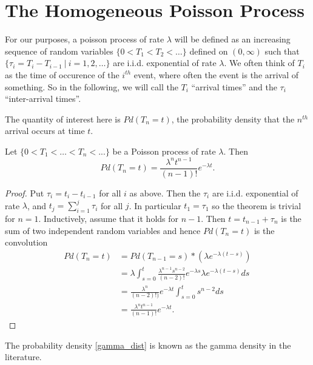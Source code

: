 \documentclass[12pt,leqno]{article}
\begin{document}
\section{The Homogeneous Poisson Process}
For our purposes, a poisson process of rate $\lambda$ will be defined as an increasing sequence of random variables
$ \{0 < T_1 < T_2 < \dots\}$ defined on $(0,\infty)$ such that $\{\tau_i = T_i-T_{i-1}~|~ i = 1,2,\dots\}$ are i.i.d.
exponential of rate $\lambda$. We often think of $T_i$ as the time of occurence of the $i^{th}$
event, where often the event is the arrival of something.  So in the following, we will call the $T_i$
``arrival times'' and the $\tau_i$ ``inter-arrival times''.  

The quantity of interest here is $Pd(T_n = t)$, the probability density that the $n^{th}$ arrival occurs at time $t$.
\begin{Thm}
  Let $\{0 < T_1<\dots<T_n<... \}$ be a Poisson process of rate $\lambda$.  Then
  \begin{equation}\label{gamma_dist}
  Pd(T_n = t) = \frac{\lambda^nt^{n-1}}{(n-1)!}e^{-\lambda{t}}.
  \end{equation}
  \begin{proof}
    Put $\tau_i = t_i - t_{i-1}$ for all $i$ as above. Then the $\tau_i$ are i.i.d. exponential of rate $\lambda$, and
    $t_j = \sum_{i=1}^j \tau_i$ for all $j$.  In particular $t_1 = \tau_1$ so the theorem is trivial for $n = 1$.
    Inductively, assume that it holds for $n-1$. Then $t = t_{n-1} + \tau_n$ is the sum of two independent random
    variables and hence $Pd(T_n = t)$ is the convolution
    \begin{align*}
      Pd(T_n = t) &= Pd(T_{n-1} = s)*({\lambda}e^{-\lambda(t-s)})\\
      &= \lambda\int_{s=0}^t\frac{\lambda^{n-1}s^{n-2}}{(n-2)!}e^{-\lambda{s}}{\lambda}e^{-\lambda(t-s)}ds \\
      &= \frac{\lambda^n}{(n-2)!)}e^{-\lambda{t}}\int_{s=0}^ts^{n-2}ds \\
      &= \frac{\lambda^nt^{n-1}}{(n-1)!}e^{-\lambda{t}}.
    \end{align*}
  \end{proof}
\end{Thm}
The probability density \eqref{gamma_dist} is known as the gamma density in the literature.
\end{document}
